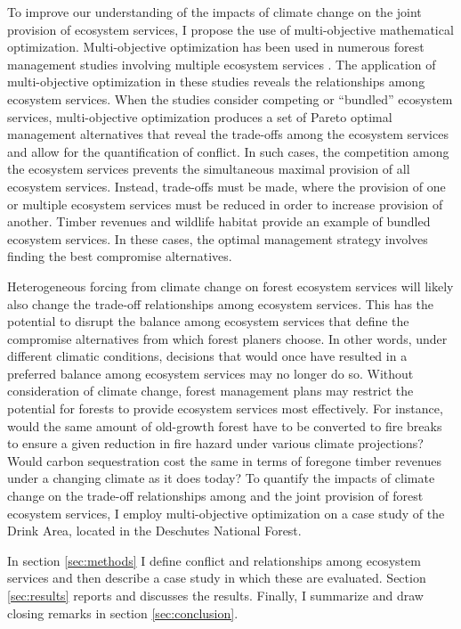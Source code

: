 To improve our understanding of the impacts of climate change on the joint provision of ecosystem services, I propose the use of multi-objective mathematical optimization. Multi-objective optimization has been used in numerous forest management studies involving multiple ecosystem services \cite{schroder2016multi}\cite{toth2009finding}\cite{diaz2008making}\cite{borges2014addressing}. The application of multi-objective optimization in these studies reveals the relationships among ecosystem services. When the studies consider competing or ``bundled'' ecosystem services, multi-objective optimization produces a set of Pareto optimal management alternatives that reveal the trade-offs among the ecosystem services and allow for the quantification of conflict. In such cases, the competition among the ecosystem services prevents the simultaneous maximal provision of all ecosystem services. Instead, trade-offs must be made, where the provision of one or multiple ecosystem services must be reduced in order to increase provision of another. Timber revenues and wildlife habitat provide an example of bundled ecosystem services. In these cases, the optimal management strategy involves finding the best compromise alternatives.

Heterogeneous forcing from climate change on forest ecosystem services will likely also change the trade-off relationships among ecosystem services. This has the potential to disrupt the balance among ecosystem services that define the compromise alternatives from which forest planers choose. In other words, under different climatic conditions, decisions that would once have resulted in a preferred balance among ecosystem services may no longer do so. Without consideration of climate change, forest management plans may restrict the potential for forests to provide ecosystem services most effectively. For instance, would the same amount of old-growth forest have to be converted to fire breaks to ensure a given reduction in fire hazard under various climate projections? Would carbon sequestration cost the same in terms of foregone timber revenues under a changing climate as it does today? To quantify the impacts of climate change on the trade-off relationships among and the joint provision of forest ecosystem services, I employ multi-objective optimization on a case study of the Drink Area, located in the Deschutes National Forest.

In section \ref{sec:methods} I define conflict and relationships among ecosystem services and then describe a case study in which these are evaluated. Section \ref{sec:results} reports and discusses the results. Finally, I summarize and draw closing remarks in section \ref{sec:conclusion}.

